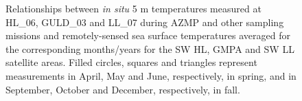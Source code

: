 \documentclass[12pt]{article}\usepackage[]{graphicx}\usepackage[]{color}
\begin{document}
\begin{figure}[htb]

{\centering {} 

}

\caption{Relationships between \emph{in situ} 5 m temperatures measured at HL\_06, GULD\_03 and LL\_07 during AZMP and other sampling missions and remotely-sensed sea surface temperatures averaged for the corresponding months/years for the SW HL, GMPA and SW LL satellite areas. Filled circles, squares and triangles represent measurements in April, May and June, respectively, in spring, and in September, October and December, respectively, in fall.}\label{fig:figure16}
\end{figure}
\clearpage
\end{document}
